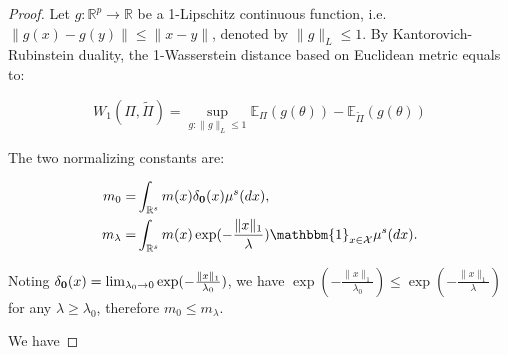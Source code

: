 \documentclass[10pt,fleqn]{article}
\newcommand{\be}{\begin{equation}\begin{aligned}}
\newcommand{\ee}{\end{aligned}\end{equation}}
\newcommand{\bb}[1]{\mathbb{#1}}
\newcommand{\mc}[1]{\mathcal{#1}}
\DeclareMathOperator{\1}{\mathbbm{1}}
\begin{document}
\begin{proof}[Proof]

Let $g:\mathbb{R}^p\to \mathbb{R}$ be a 1-Lipschitz continuous function, i.e. $\|g(x)-g(y)\|\le \|x-y\|$, denoted by $\|g\|_L\le 1$. 
By Kantorovich-Rubinstein duality, the 1-Wasserstein distance based on Euclidean metric equals to: 

\begin{equation}
W_1(\Pi,\tilde\Pi)=\underset{g:\|g\|_L\le 1}\sup \bb E_{\Pi}(g(\theta)) -
\bb E_{\tilde \Pi}(g(\theta))
\end{equation}


 


The two normalizing constants are:

\be
m_0 = &  \int_{\mathbb R^s}m(x) \delta_{\bf 0}(x)\mu^{s}(dx),  \\
m_\lambda  = & \int_{\mathbb R^s} m(x) \exp(-\frac{\|x\|_1}{\lambda})\mathbbm{1}_{x\in
\mathcal X}\mu^{s}(dx).
\ee

Noting $ \delta_{\bf 0}(x) = \lim_{\lambda_0 \to 0}  \exp(-\frac{\|x\|_1}{\lambda_0})$,
we have  $ \exp(-\frac{\|x\|_1}{\lambda_0}) \le  \exp(-\frac{\|x\|_1}{\lambda})$ for any $\lambda \ge \lambda_0$, therefore $m_0 \le m_\lambda$.


We have




\end{proof}
\end{document}
